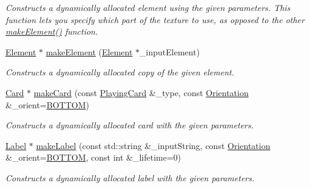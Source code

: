 \begin{DoxyCompactItemize}
\begin{DoxyCompactList}\small\item\em Constructs a dynamically allocated element using the given parameters. This function lets you specify which part of the texture to use, as opposed to the other \hyperlink{classGUI_1_1ElementMaker_adc28a4059d3ae86c2dcb56dcc7edf728}{make\-Element()} function. \end{DoxyCompactList}\item 
\hyperlink{classGUI_1_1Element}{Element} $\ast$ \hyperlink{classGUI_1_1ElementMaker_acd4edd22fa072d8f3ebb7358563c7c68}{make\-Element} (\hyperlink{classGUI_1_1Element}{Element} $\ast$\-\_\-input\-Element)
\begin{DoxyCompactList}\small\item\em Constructs a dynamically allocated copy of the given element. \end{DoxyCompactList}\item 
\hyperlink{classGUI_1_1Card}{Card} $\ast$ \hyperlink{classGUI_1_1ElementMaker_a4dabb3d89ccb1b10e7de81e0681adaf3}{make\-Card} (const \hyperlink{classPlayingCard}{Playing\-Card} \&\-\_\-type, const \hyperlink{namespaceGUI_a1a3a8094d47f7be06ce123fab38abf6a}{Orientation} \&\-\_\-orient=\hyperlink{namespaceGUI_a1a3a8094d47f7be06ce123fab38abf6aafb2c9cf323a63df7a7ac4ade2e4e63e5}{B\-O\-T\-T\-O\-M})
\begin{DoxyCompactList}\small\item\em Constructs a dynamically allocated card with the given parameters. \end{DoxyCompactList}\item 
\hyperlink{classGUI_1_1Label}{Label} $\ast$ \hyperlink{classGUI_1_1ElementMaker_aa2ec4f63848cc27d751d91012f67279a}{make\-Label} (const std\-::string \&\-\_\-input\-String, const \hyperlink{namespaceGUI_a1a3a8094d47f7be06ce123fab38abf6a}{Orientation} \&\-\_\-orient=\hyperlink{namespaceGUI_a1a3a8094d47f7be06ce123fab38abf6aafb2c9cf323a63df7a7ac4ade2e4e63e5}{B\-O\-T\-T\-O\-M}, const int \&\-\_\-lifetime=0)
\begin{DoxyCompactList}\small\item\em Constructs a dynamically allocated label with the given parameters. \end{DoxyCompactList}\end{DoxyCompactItemize}
